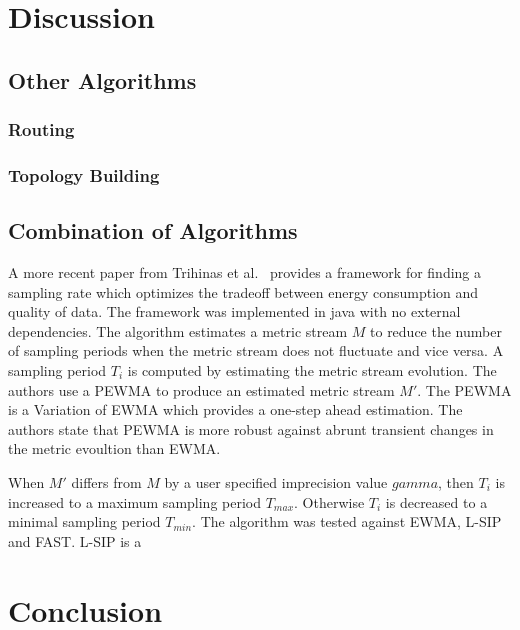 \subsection{\catIII}
\label{sec:catIII}


\section{Discussion}
\label{sec:Discussion}


\subsection{Other Algorithms}
\label{sec:Listings}

\subsubsection{Routing}
\label{sec:Listings}

\subsubsection{Topology Building}
\label{sec:Listings}


\subsection{Combination of Algorithms}
\label{sec:Listings}
A more recent paper from Trihinas et al.~\cite{trihinas2015adam} provides a
framework for finding a sampling rate which optimizes the tradeoff between
energy consumption and quality of data. The framework was implemented in java
with no external dependencies. The algorithm estimates a metric stream $ M $
to reduce the number of sampling periods when the metric stream does not
fluctuate and vice versa. A sampling period $ T_i $ is computed by estimating
the metric stream evolution. The authors use a \ac{PEWMA} to produce an
estimated metric stream $ M' $. The \ac{PEWMA} is a Variation of \ac{EWMA}
which provides a one-step ahead estimation. The authors state that \ac{PEWMA}
is more robust against abrunt transient changes in the metric evoultion than
\ac{EWMA}.

When $ M' $ differs from $ M $ by a user specified imprecision value $
gamma $, then $ T_i $ is increased to a maximum sampling period $ T_{max}
$. Otherwise $ T_i $ is decreased to a minimal sampling period $ T_{min}
$. The algorithm was tested against \ac{EWMA}, L-SIP and FAST. L-SIP is a  

\section{Conclusion}